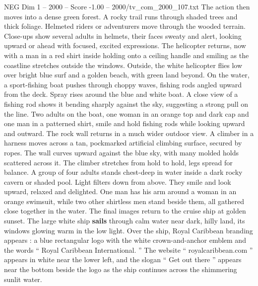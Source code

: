 \begin{textsample}{NEG Dim 1 – 2000 – Score -1.00 – 2000/tv\_com\_2000\_107.txt}
The action then moves into a dense green forest.
A rocky trail runs through shaded trees and thick foliage.
Helmeted riders or adventurers move through the wooded terrain.
Close-ups show several adults in helmets, their faces sweaty and alert, looking upward or ahead with focused, excited expressions.
The helicopter returns, now with a man in a red shirt inside holding onto a ceiling handle and smiling as the coastline stretches outside the windows.
Outside, the white helicopter flies low over bright blue surf and a golden beach, with green land beyond.
On the water, a sport-fishing boat pushes through choppy waves, fishing rods angled upward from the deck.
Spray rises around the blue and white boat.
A close view of a fishing rod shows it bending sharply against the sky, suggesting a strong pull on the line.
Two adults on the boat, one woman in an orange top and dark cap and one man in a patterned shirt, smile and hold fishing rods while looking upward and outward.
The rock wall returns in a much wider outdoor view.
A climber in a harness moves across a tan, pockmarked artificial climbing surface, secured by ropes.
The wall curves upward against the blue sky, with many molded holds scattered across it.
The climber stretches from hold to hold, legs spread for balance.
A group of four adults stands chest-deep in water inside a dark rocky cavern or shaded pool.
Light filters down from above.
They smile and look upward, relaxed and delighted.
One man has his arm around a woman in an orange swimsuit, while two other shirtless men stand beside them, all gathered close together in the water.
The final images return to the cruise ship at golden sunset.
The large white ship \textbf{sails} through calm water near dark, hilly land, its windows glowing warm in the low light.
Over the ship, Royal Caribbean branding appears : a blue rectangular logo with the white crown-and-anchor emblem and the words “ Royal Caribbean International. ” The website “ royalcaribbean.com ” appears in white near the lower left, and the slogan “ Get out there ” appears near the bottom beside the logo as the ship continues across the shimmering sunlit water.

\end{textsample}
